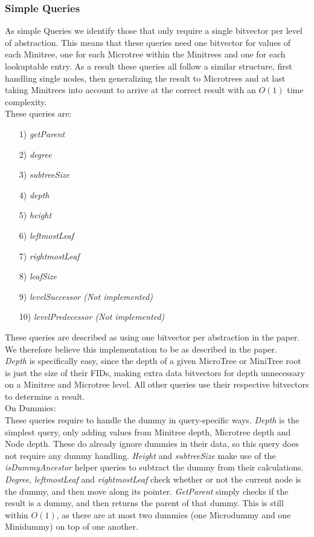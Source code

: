 \documentclass{article}
\begin{document}
\subsubsection{Simple Queries}
As simple Queries we identify those that only require a single bitvector per level of abstraction. This means that these queries need one bitvector for values of each Minitree, one for each Microtree within the Minitrees and one for each lookuptable entry.
As a result these queries all follow a similar structure, first handling single nodes, then generalizing the result to Microtrees and at last taking Minitrees into account to arrive at the correct result with an $O(1)$ time complexity.\\
These queries are:\\
\begin{itemize}
	\item[1)] \textit{getParent}
	\item[2)] \textit{degree}
	\item[3)] \textit{subtreeSize}
	\item[4)] \textit{depth}
	\item[5)] \textit{height}
	\item[6)] \textit{leftmostLeaf}
	\item[7)] \textit{rightmostLeaf}
	\item[8)] \textit{leafSize}
	\item[9)] \textit{levelSuccessor (Not implemented)}
	\item[10)] \textit{levelPredecessor (Not implemented)}
\end{itemize}
These queries are described as using one bitvector per abstraction in the paper. We therefore believe this implementation to be as described in the paper.\\
\textit{Depth} is specifically easy, since the depth of a given MicroTree or MiniTree root is just the size of their FIDs, making extra data bitvectors for depth unnecessary on a Minitree and Microtree level. All other queries use their respective bitvectors to determine a result.\\
On Dummies:\\
These queries require to handle the dummy in query-specific ways. \textit{Depth} is the simplest query, only adding values from Minitree depth, Microtree depth and Node depth. These do already ignore dummies in their data, so this query does not require any dummy handling. \textit{Height} and \textit{subtreeSize} make use of the \textit{isDummyAncestor} helper queries to subtract the dummy from their calculations. \textit{Degree}, \textit{leftmostLeaf} and \textit{rightmostLeaf} check whether or not the current node is the dummy, and then move along its pointer. \textit{GetParent} simply checks if the result is a dummy, and then returns the parent of that dummy. This is still within $O(1)$, as there are at most two dummies (one Microdummy and one Minidummy) on top of one another.\\
\end{document}
